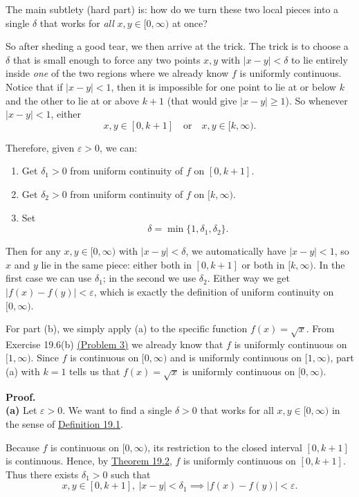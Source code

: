 \documentclass[12pt]{article}
\begin{document}
The main subtlety (hard part) is: how do we turn these two local pieces into a single $\delta$ that works for \emph{all} $x,y \in [0,\infty)$ at once?

So after sheding a good tear, we then arrive at the trick. The trick is to choose a $\delta$ that is small enough to force any two points $x,y$ with $|x-y|<\delta$ to lie entirely inside \emph{one} of the two regions where we already know $f$ is uniformly continuous.  Notice that if $|x-y|<1$, then it is impossible for one point to lie at or below $k$ and the other to lie at or above $k+1$ (that would give $|x-y|\ge 1$). So whenever $|x-y|<1$, either
\[
x,y \in [0,k+1]  \quad\text{or}\quad  x,y \in [k,\infty).
\]

Therefore, given $\varepsilon>0$, we can:
\begin{enumerate}[label=(\roman*)]
  \item Get $\delta_1>0$ from uniform continuity of $f$ on $[0,k+1]$.
  \item Get $\delta_2>0$ from uniform continuity of $f$ on $[k,\infty)$.
  \item Set
        \[
        \delta = \min\{1,\delta_1,\delta_2\}.
        \]
\end{enumerate}
Then for any $x,y\in[0,\infty)$ with $|x-y|<\delta$, we automatically have
$|x-y|<1$, so $x$ and $y$ lie in the same piece: either both in $[0,k+1]$ or both
in $[k,\infty)$.  In the first case we can use $\delta_1$; in the second we use
$\delta_2$.  Either way we get $|f(x)-f(y)|<\varepsilon$, which is exactly the
definition of uniform continuity on $[0,\infty)$.

For part (b), we simply apply (a) to the specific function $f(x)=\sqrt{x}$.
From Exercise 19.6(b) \hyperref[thm:3]{(Problem 3)} we already know that $f$ is uniformly continuous on $[1,\infty)$.  Since $f$ is continuous on $[0,\infty)$ and is uniformly continuous on $[1,\infty)$, part (a) with $k=1$ tells us that $f(x)=\sqrt{x}$ is uniformly continuous on $[0,\infty)$.
\vspace{0.25em}

\textbf{Proof.}\\
\textbf{(a)} 
Let $\varepsilon>0$. We want to find a single $\delta>0$ that works for
all $x,y\in[0,\infty)$ in the sense of \hyperref[def:19.1]{Definition 19.1}.

Because $f$ is continuous on $[0,\infty)$, its restriction to the closed interval
$[0,k+1]$ is continuous.  Hence, by \hyperref[thm:19.2]{Theorem 19.2}, $f$ is
uniformly continuous on $[0,k+1]$.  Thus there exists $\delta_1>0$ such that
\[
x,y\in[0,k+1],\ |x-y|<\delta_1 \implies |f(x)-f(y)|<\varepsilon.
\]
\end{document}
